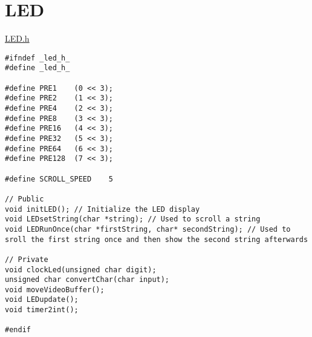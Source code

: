 \section{LED}
\label{LED}

\underline{LED.h}
\begin{lstlisting}
#ifndef _led_h_
#define _led_h_

#define PRE1	(0 << 3);
#define PRE2	(1 << 3);
#define PRE4	(2 << 3);
#define PRE8	(3 << 3);
#define PRE16	(4 << 3);
#define PRE32	(5 << 3);
#define PRE64	(6 << 3);
#define PRE128	(7 << 3);

#define SCROLL_SPEED	5

// Public
void initLED(); // Initialize the LED display
void LEDsetString(char *string); // Used to scroll a string
void LEDRunOnce(char *firstString, char* secondString); // Used to sroll the first string once and then show the second string afterwards	

// Private
void clockLed(unsigned char digit);
unsigned char convertChar(char input);
void moveVideoBuffer();
void LEDupdate();
void timer2int();

#endif
\end{lstlisting}

